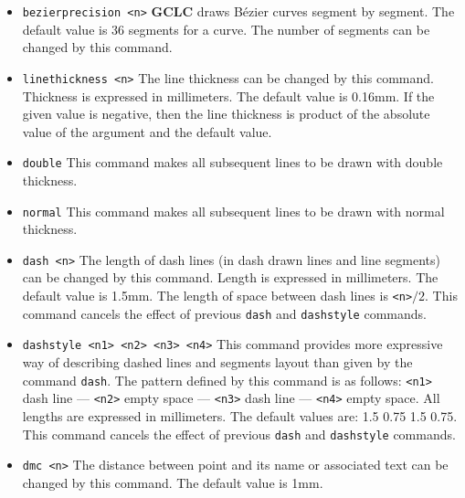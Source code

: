 \documentclass[a4paper]{book}
\newcommand{\gclc}{{\bfseries GCLC}\xspace}
\begin{document}
\begin{itemize}
\item \verb|bezierprecision <n>|
        \gclc draws Bézier curves segment by segment. The default value
        is 36 segments for a curve. The number of segments can be changed
        by this command.


\item \verb|linethickness <n>|
        The line thickness can be changed by this command. Thickness is
        expressed in millimeters. The default value is 0.16mm.
        If the given value is negative, then the line thickness is
        product of the absolute value of the argument and the default value.

\item \verb|double|
        This command makes all subsequent lines to be drawn with double thickness.

\item \verb|normal|
        This command makes all subsequent lines to be drawn with normal thickness.

\item \verb|dash <n>|
        The length of dash lines (in dash drawn lines and line segments)
        can be changed by this command. Length is expressed in millimeters.
        The default value is 1.5mm. The length of space between dash
        lines is \verb|<n>|$/2$. This command cancels the effect of
        previous \verb|dash| and \verb|dashstyle| commands.

\item \verb|dashstyle <n1> <n2> <n3> <n4>|
        This command provides more expressive way of describing dashed
        lines and segments layout than given by the command \verb|dash|.
        The pattern defined by this command is as follows:
        \verb|<n1>| dash line --- \verb|<n2>| empty space ---
        \verb|<n3>| dash line --- \verb|<n4>| empty space.
        All lengths are expressed in millimeters.
        The default values are: 1.5 0.75 1.5 0.75.
        This command cancels the effect of
        previous \verb|dash| and \verb|dashstyle| commands.

\item \verb|dmc <n>|
        The distance between point and its name or associated text can
        be changed by this command. The default value is 1mm.


\end{itemize}
\end{document}
